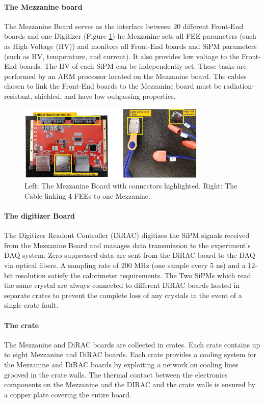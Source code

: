 \paragraph{The Mezzanine board}
The Mezzanine Board serves as the interface between 20 different 
Front-End boards and one Digitizer (Figure \ref{fig:mezzanine}) 
he Mezzanine sets all FEE parameters (such as High Voltage (HV)) and 
monitors all Front-End boards and SiPM parameters (such as HV, temperature, and current). 
It also provides low voltage to the Front-End boards. The HV of each SiPM can be 
independently set. These tasks are performed by an ARM processor located on the 
Mezzanine board. The cables chosen to link the Front-End boards to the 
Mezzanine board must be radiation-resistant, shielded, and have low outgassing properties. 
\begin{figure}[!h]
    \centering
    \includegraphics[width =0.8\textwidth]{figures/png/Screenshot_20240706_144234.png}
    \caption[The calorimeter Mezzanine Board and FEE.]{Left: The Mezzanine Board with connectors highlighted. 
    Right: The Cable linking 4 FEEs to one Mezzanine.}
    \label{fig:mezzanine}
\end{figure}



\paragraph{The digitizer Board}
The Digitizer Readout Controller (DiRAC) digitizes the SiPM 
signals received from the Mezzanine Board and manages data 
transmission to the experiment's DAQ system. Zero suppressed 
data are sent from the DiRAC board to the DAQ via optical fibers. 
A sampling rate of 200 MHz (one sample every 5 ns) and a 12-bit resolution 
satisfy the calorimeter requirements. The Two SiPMs which read the same 
crystal are always connected to different DiRAC boards hosted in separate 
crates to prevent the complete loss of any crystals in the event of a single crate fault.

\paragraph{The crate}
The Mezzanine and DiRAC boards are collected in crates. Each crate contains up to eight Mezzanine 
and DiRAC boards. Each crate provides a cooling system for the Mezzanine and DiRAC boards by 
exploiting a network on cooling lines grooved in the crate walls. The thermal contact between 
the electronics components on the Mezzanine and the DIRAC and the crate walls is ensured by a 
copper plate covering the entire board.
